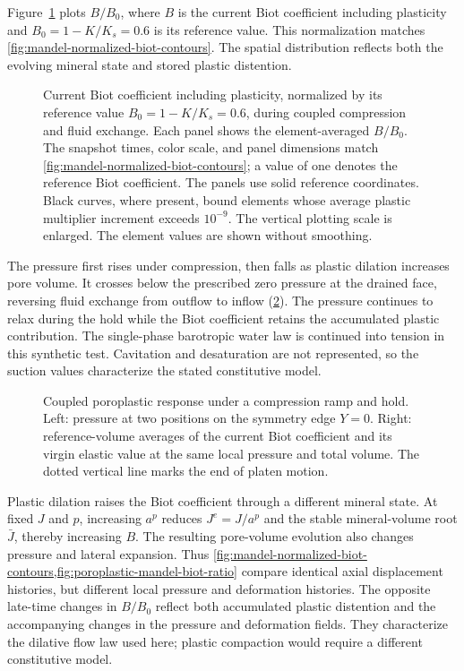 Figure~\ref{fig:poroplastic-mandel-biot-ratio} plots \(B/B_0\), where
\(B\) is the current Biot coefficient including plasticity and
\(B_0=1-K/K_s=0.6\) is its reference value.  This normalization matches
\cref{fig:mandel-normalized-biot-contours}.  The spatial distribution reflects
both the evolving mineral state and stored plastic distention.

\begin{figure}[ht]
 \centering
 \caption{Current Biot coefficient including plasticity, normalized by its
 reference value \(B_0=1-K/K_s=0.6\), during coupled compression and fluid exchange.
 Each panel shows the element-averaged \(B/B_0\).
 The snapshot times, color scale, and panel dimensions match
 \cref{fig:mandel-normalized-biot-contours};
 a value of one denotes the reference Biot coefficient. The panels use solid
 reference coordinates. Black curves, where present, bound elements whose average plastic
 multiplier increment exceeds \(10^{-9}\).
 The vertical plotting scale is enlarged.  The element values are shown
 without smoothing.}
 \label{fig:poroplastic-mandel-biot-ratio}
\end{figure}

The pressure first rises under compression, then falls as plastic dilation
increases pore volume.  It crosses below the prescribed zero pressure at the
drained face, reversing fluid exchange from outflow to inflow
(\cref{fig:poroplastic-mandel-history}).  The pressure continues to relax
during the hold while the Biot coefficient retains the accumulated plastic
contribution.  The single-phase barotropic water law is continued into tension
in this synthetic test.  Cavitation and desaturation are not represented, so
the suction values characterize the stated constitutive model.

\begin{figure}[ht]
 \centering
 \caption{Coupled poroplastic response under a compression ramp and hold.
 Left: pressure at two positions on the symmetry edge \(Y=0\).
 Right: reference-volume averages of the current Biot coefficient and its
 virgin elastic value at the same local pressure and total volume.
 The dotted vertical line marks the end of platen motion.}
 \label{fig:poroplastic-mandel-history}
\end{figure}

Plastic dilation raises the Biot coefficient through a different mineral state.
At fixed \(J\) and \(p\), increasing \(a^p\) reduces \(J^e=J/a^p\)
and the stable mineral-volume root \(\bar J\), thereby increasing \(B\).
The resulting pore-volume evolution also changes pressure and lateral
expansion. Thus \cref{fig:mandel-normalized-biot-contours,fig:poroplastic-mandel-biot-ratio}
compare identical axial displacement histories, but different local pressure
and deformation histories. The opposite late-time changes in \(B/B_0\)
reflect both accumulated plastic distention and the accompanying changes
in the pressure and deformation fields.
They characterize the dilative flow law used here; plastic compaction would
require a different constitutive model.

